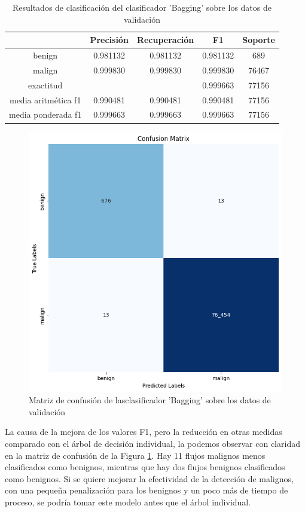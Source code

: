 \begin{table}[H]
    \begin{center}
        \begin{tabular}{|c | c c c | c |} 
            \hline
            & \textbf{Precisión} & \textbf{Recuperación} & \textbf{F1}  & \textbf{Soporte} \\
            \hline
            benign               & 0.981132 & 0.981132 & 0.981132  &   689 \\
            malign               & 0.999830 & 0.999830 & 0.999830  & 76467 \\
            \hline
            exactitud            &          &          & 0.999663  & 77156 \\
            media aritmética f1  & 0.990481 & 0.990481 & 0.990481  & 77156 \\
            media ponderada f1   & 0.999663 & 0.999663 & 0.999663  & 77156 \\
            \hline
        \end{tabular}
    \end{center}
    \caption{Resultados de clasificación del clasificador 'Bagging' sobre los datos de validación}
    \label{table:baggingresults}
\end{table}

\begin{figure}[H]
    \begin{center}
        \includegraphics[width=0.55\linewidth]{media/packet_pincer_train_models_bagging.png}
    \end{center}
    \caption{Matriz de confusión de lasclasificador 'Bagging' sobre los datos de validación}\label{fig:baggingmatrix}
\end{figure}

La causa de la mejora de los valores F1, pero la reducción en otras medidas comparado con el árbol de decisión individual, la podemos observar con claridad en la matriz de confusión de la Figura \ref{fig:baggingmatrix}. Hay 11 flujos malignos menos clasificados como benignos, mientras que hay dos flujos benignos clasificados como benignos. Si se quiere mejorar la efectividad de la detección de malignos, con una pequeña penalización para los benignos y un poco más de tiempo de proceso, se podría tomar este modelo antes que el árbol individual.

